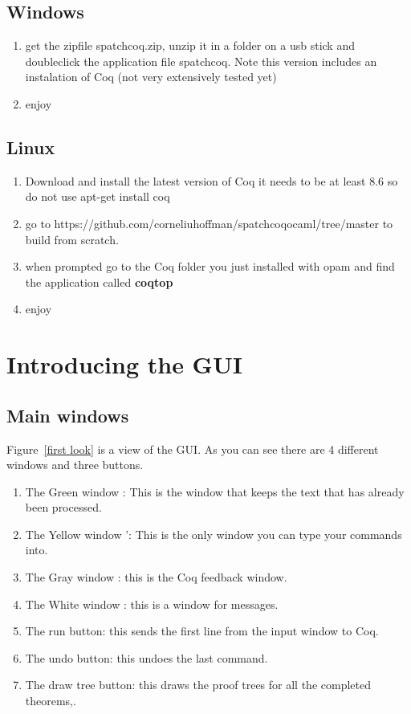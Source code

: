 \subsection{Windows}
\begin{enumerate}

\item get the zipfile spatchcoq.zip,  unzip it in a folder on a usb stick and doubleclick the application file spatchcoq. 
Note this version includes an instalation of Coq (not very extensively tested yet)

\item enjoy
\end{enumerate}


\subsection{Linux}
\begin{enumerate}
\item Download and install  the latest version of Coq it needs to be at least 8.6 so do not use 
apt-get install coq
\item  go to https://github.com/corneliuhoffman/spatchcoqocaml/tree/master
to build from scratch.
\item when prompted go to the Coq folder you just installed with opam and find  the application called {\bf coqtop}

\item enjoy
\end{enumerate}

\section{Introducing the GUI}
\subsection{Main windows}
Figure~\ref{first look} is a view of the GUI. As you can see there are 4 different windows and three buttons.
\begin{enumerate}
\item The Green window  : This is the window that keeps the text that has already been processed.
\item The Yellow window ': This is the only window you can type your commands into.
\item The Gray  window : this is the Coq feedback window. 
\item The White window : this is a window for messages.
\item The run button: this sends the first line from the input window to Coq.
\item The undo button: this undoes the last command.
\item The draw tree button: this draws the proof trees for all the completed theorems,.
\end{enumerate}


